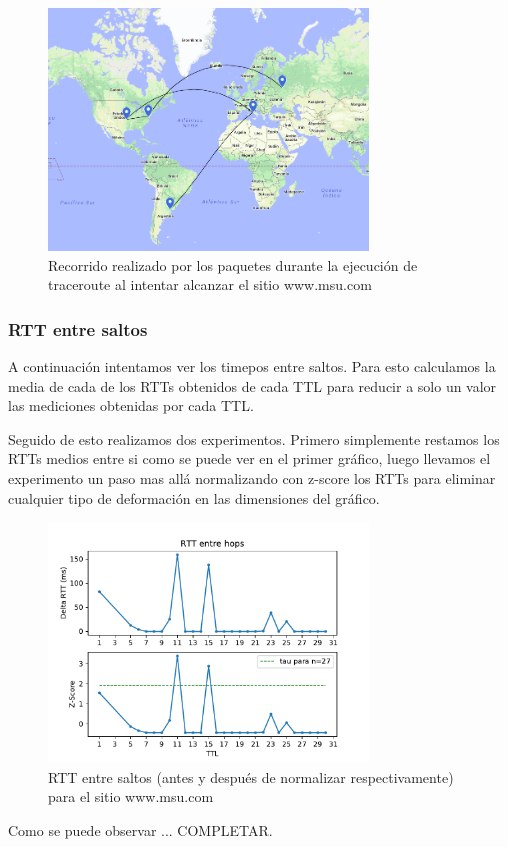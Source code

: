 \begin{figure}[H]
  \centering
  \includegraphics[width=8.5cm]{figs/moscow.png}
  \caption{\normalfont Recorrido realizado por los paquetes durante la ejecución de traceroute al intentar alcanzar el sitio www.msu.com}
\end{figure}

\subsubsection*{RTT entre saltos}

A continuación intentamos ver los timepos entre saltos. Para esto calculamos la media de cada de los RTTs obtenidos de cada TTL para reducir a solo un valor las mediciones obtenidas por cada TTL. 

Seguido de esto realizamos dos experimentos. Primero simplemente restamos los RTTs medios entre si como se puede ver en el primer gráfico, luego llevamos el experimento un paso mas allá normalizando con z-score los RTTs para eliminar cualquier tipo de deformación en las dimensiones del gráfico.

\begin{figure}[H]
  \centering
  \includegraphics[width=8.5cm]{figs/traceroute-moscow.pdf}
  \caption{\normalfont RTT entre saltos (antes y después de normalizar respectivamente) para el sitio www.msu.com}
\end{figure}

Como se puede observar ... COMPLETAR.